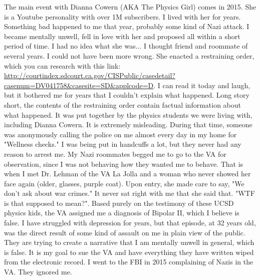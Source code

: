 \documentclass[a4paper]{arthur-letter}
\begin{document}
\begin{letter}
            The main event with Dianna Cowern (AKA The Physics Girl) comes in 2015. She is a Youtube personality with over 1M subscribers. I lived with her for years. Something bad happened to me that year, probably some kind of Nazi attack. I became mentally unwell, fell in love with her and proposed all within a short period of time. I had no idea what she was... I thought friend and roommate of several years. I could not have been more wrong. She enacted a restraining order, which you can research with this link: \url{http://courtindex.sdcourt.ca.gov/CISPublic/casedetail?casenum=DV041758&casesite=SD&applcode=D}. I can read it today and laugh, but it bothered me for years that I couldn't explain what happened. Long story short, the contents of the restraining order contain factual information about what happened. It was put together by the physics students we were living with, including Dianna Cowern. It is extremely misleading. During that time, someone was anonymously calling the police on me almost every day in my home for "Wellness checks." I was being put in handcuffs a lot, but they never had any reason to arrest me. My Nazi roommates begged me to go to the VA for observation, since I was not behaving how they wanted me to behave. That is when I met Dr. Lehman of the VA La Jolla and a woman who never showed her face again (older, glasses, purple coat). Upon entry, she made care to say, "We don't ask about war crimes." It never sat right with me that she said that. "WTF is that supposed to mean?". Based purely on the testimony of these UCSD physics kids, the VA assigned me a diagnosis of Bipolar II, which I believe is false. I have struggled with depression for years, but that episode, at 32 years old, was the direct result of some kind of assault on me in plain view of the public. They are trying to create a narrative that I am mentally unwell in general, which is false. It is my goal to sue the VA and have everything they have written wiped from the electronic record. I went to the FBI in 2015 complaining of Nazis in the VA. They ignored me. \\
            

\end{letter}
\end{document}
